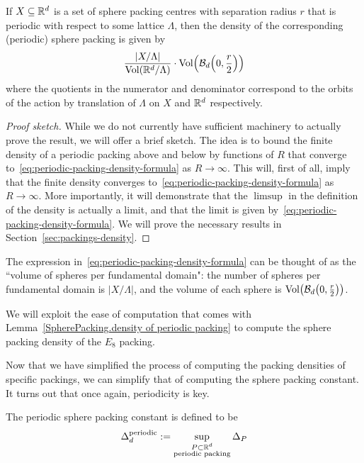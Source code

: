 \begin{lemma}\label{SpherePacking.density of periodic packing}\notready
  If $X \subseteq \mathbb{R}^d$ is a set of sphere packing centres with separation radius $r$ that is periodic with respect to some lattice $\Lambda$, then the density of the corresponding (periodic) sphere packing is given by
  \begin{equation}
    \frac{\left\lvert X/\Lambda \right\rvert}{\operatorname{Vol}\!\left(\mathbb{R}^d / \Lambda\right)} \cdot \operatorname{Vol}\!\left(\mathcal{B}_d\!\left(0, \frac{r}{2}\right)\right)
    \label{eq:periodic-packing-density-formula}
  \end{equation}
  where the quotients in the numerator and denominator correspond to the orbits of the action by translation of $\Lambda$ on $X$ and $\mathbb{R}^d$ respectively.
\end{lemma}
\begin{proof}[Proof sketch]
  While we do not currently have sufficient machinery to actually prove the result, we will offer a brief sketch. The idea is to bound the finite density of a periodic packing above and below by functions of $R$ that converge to~\eqref{eq:periodic-packing-density-formula} as $R \to \infty$. This will, first of all, imply that the finite density converges to~\eqref{eq:periodic-packing-density-formula} as $R \to \infty$. More importantly, it will demonstrate that the $\limsup$ in the definition of the density is actually a limit, and that the limit is given by~\eqref{eq:periodic-packing-density-formula}. We will prove the necessary results in Section~\ref{sec:packings-density}.
\end{proof}

\begin{remark}
  The expression in~\eqref{eq:periodic-packing-density-formula} can be thought of as the ``volume of spheres per fundamental domain": the number of spheres per fundamental domain is $\lvert {X/\Lambda} \rvert$, and the volume of each sphere is $\operatorname{Vol}\!\left(\mathcal{B}_d\!\left(0, \frac{r}{2}\right)\right)$.
\end{remark}

We will exploit the ease of computation that comes with Lemma~\ref{SpherePacking.density of periodic packing} to compute the sphere packing density of the $E_8$ packing.

Now that we have simplified the process of computing the packing densities of specific packings, we can simplify that of computing the sphere packing constant. It turns out that once again, periodicity is key.

\begin{definition}\label{def-Periodic-sphere-packing-constant}\notready
    The periodic sphere packing constant is defined to be
    $$ \Delta_{d}^{\text{periodic}} := \sup_{\substack{P \subset \mathbb{R}^d \\ \text{periodic packing}}} \Delta_P$$
\end{definition}

